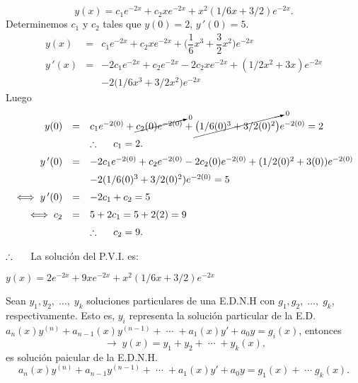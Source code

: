 \documentclass[9pt]{beamer}
\begin{document}
\begin{frame}[t]
	\begin{alertblock}{}
		\small
		\[
			y(x) = c_1e^{-2x} + c_2xe^{-2x} + x^2(1/6x+3/2) e^{-2x}.
		\]
		Determinemos \(c_1\) y \(c_2\) tales que \(y(0) = 2\), \(y\,'(0) = 5\).
		\[
			\begin{array}{rcl}
				y(x) & = & c_1e^{-2x} + c_2xe^{-2x} + \bigg(\dfrac{1}{6} x^3 + \dfrac{3}{2} x^2\bigg) e^{-2x} \\[2mm]
				y\,'(x) & = & -2c_1e^{-2x} +c_2e^{-2x} -2c_2xe^{-2x} + (1/2x^2+3x) e^{-2x} \\[2mm] 
				&& - 2 \big(1/6x^3+3/2x^2\big) e^{-2x}
			\end{array}
		\]
		Luego
		\[
			\begin{array}{rcl}
				y(0) & = & c_1e^{-2(0)} + \cancelto{0}{c_2(0) e^{-2(0)}} + \cancelto{0}{\big(1/6(0) ^3+3/2(0) ^2\big)} e^{-2(0)} = 2\\[2mm]
				&& \therefore \hspace{5mm} c_1 = 2. \\[2mm]
				y\,'(0) & = & -2c_1e^{-2(0)} +c_2e^{-2(0)} -2c_2(0) e^{-2(0)} +(1/2(0) ^2+3(0)) e^{-2(0)} \\[2mm]
				&& -2(1/6(0) ^3+3/2 (0) ^2) e^{-2(0)} = 5 \\[2mm]
				\iff y\,'(0) & = & -2c_1+c_2 = 5 \\[2mm]
				\iff c_2 & = & 5+2c_1 = 5 +2(2) = 9 \\[2mm]
				&& \therefore \hspace{5mm} c_2 = 9.
			\end{array}
		\]
	\end{alertblock}
\end{frame}

\begin{frame}[t]
	\begin{alertblock}{}
		\(\therefore \hspace{5mm}\) La solución del P.V.I. es:
		\begin{center}
			\color{red} \underline{\color{black} \(y(x) = 2e^{-2x} +9xe^{-2x} +x^2(1/6x+3/2) e^{-2x}\)}
		\end{center}
	\end{alertblock}
	\begin{block}{}
		Sean \(y_1,y_2, \;\ldots,\; y_k\) soluciones particulares de una E.D.N.H con \(g_1, g_2, \;\ldots,\; g_k\), respectivamente. Esto es, \(y_i\) representa la solución particular de la E.D. \(a_n(x) y^(n) + a_{n-1} (x) y^{(n-1)} + \;\cdots\; + a_1(x) y' +a_0y = g_i(x)\), entonces
		\[
			\; \longrightarrow \; y(x) = y_1+ y_2+ \;\cdots\; +y_k(x),
		\]
		es solución paicular de la E.D.N.H.
		\[
			a_n(x) y^{(n)} + a_{n-1} y^{(n-1)} + \;\cdots\; + a_1(x) y' +a_0y=g_1(x) + \;\cdots\; g_k(x).
		\]
	\end{block}
\end{frame}
\end{document}
